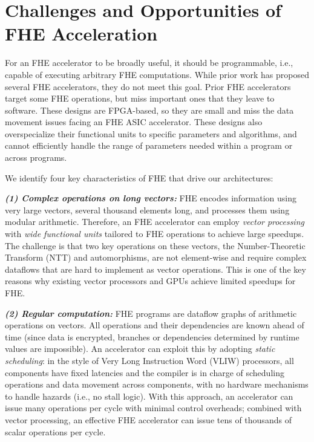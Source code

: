 \section{Challenges and Opportunities of FHE Acceleration}
\label{sec:general}

For an FHE accelerator to be broadly useful, it should be programmable, i.e.,
capable of executing arbitrary FHE computations. While prior work has proposed
several FHE accelerators, they do not meet this goal. Prior FHE
accelerators~\cite{cousins:hpec14:fpga-he,cousins:tetc17:fpga-he,doroz:tc15:accelerating-fhe,roy:hpca19:fpga-he,riazi:asplos20:heax,turan:tc20:heaws}
target some FHE operations, but miss important ones that they leave to
software. These designs are FPGA-based, so they are small and miss the data
movement issues facing an FHE ASIC accelerator. These designs also
overspecialize their functional units to specific parameters and algorithms,
and cannot efficiently handle the range of parameters needed within a program
or across programs.

We identify four key characteristics of FHE that drive our architectures:

\noindent \textbf{\emph{(1) Complex operations on long vectors:}}
FHE encodes information using very large vectors, several thousand elements
long, and processes them using modular arithmetic. Therefore, an FHE
accelerator can employ \emph{vector processing} with \emph{wide functional
units} tailored to FHE operations to achieve large speedups. The challenge is
that two key operations on these vectors, the Number-Theoretic Transform (NTT)
and automorphisms, are not element-wise and require complex dataflows that are
hard to implement as vector operations. This is one of the key reasons why
existing vector processors and GPUs achieve limited speedups for FHE.

\noindent \textbf{\emph{(2) Regular computation:}}
FHE programs are dataflow graphs of arithmetic operations on vectors. All
operations and their dependencies are known ahead of time (since data is
encrypted, branches or dependencies determined by runtime values are
impossible). An accelerator can exploit this by adopting \emph{static
scheduling}: in the style of Very Long Instruction Word (VLIW) processors, all
components have fixed latencies and the compiler is in charge of scheduling
operations and data movement across components, with no hardware mechanisms to
handle hazards (i.e., no stall logic). With this approach, an accelerator can
issue many operations per cycle with minimal control overheads; combined with
vector processing, an effective FHE accelerator can issue tens of thousands of
scalar operations per cycle.

